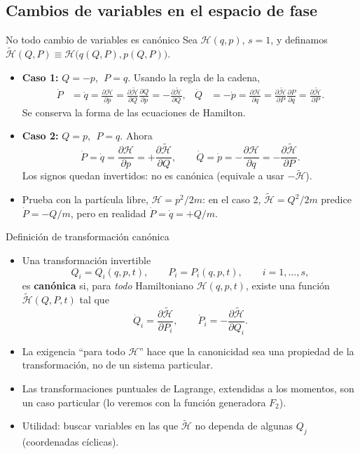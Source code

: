 \documentclass[spanish]{beamer}
\newcommand{\Ham}{\mathcal{H}}               %
\newcommand{\tH}{\tilde{\mathcal{H}}}        %
\newcommand{\pd}[2]{\frac{\partial #1}{\partial #2}}
\begin{document}
\subsection{Cambios de variables en el espacio de fase}
\begin{frame}{No todo cambio de variables es canónico}
\small
Sea $\Ham(q,p)$, $s=1$, y definamos $\tH(Q,P)\equiv\Ham\big(q(Q,P),p(Q,P)\big)$.
\begin{itemize}[<+->]
  \item \textbf{Caso 1:} $Q=-p$, $\;P=q$. Usando la regla de la cadena,
        \begin{align*}
          \dot P&=\dot q=\pd{\Ham}{p}=\pd{\tH}{Q}\pd{Q}{p}=-\pd{\tH}{Q}, &
          \dot Q&=-\dot p=\pd{\Ham}{q}=\pd{\tH}{P}\pd{P}{q}=\pd{\tH}{P}.
        \end{align*}
        \alert{Se conserva la forma de las ecuaciones de Hamilton.}
  \item \textbf{Caso 2:} $Q=p$, $\;P=q$. Ahora
        \[
          \dot P=\dot q=\pd{\Ham}{p}=+\pd{\tH}{Q},\qquad
          \dot Q=\dot p=-\pd{\Ham}{q}=-\pd{\tH}{P}.
        \]
        Los signos quedan invertidos: \alert{no es canónica}
        (equivale a usar $-\tH$).
  \item Prueba con la partícula libre, $\Ham=p^2/2m$: en el caso 2,
        $\tH=Q^2/2m$ predice $\dot P=-Q/m$, pero en realidad $\dot P=\dot q=+Q/m$.
\end{itemize}
\end{frame}

\begin{frame}{Definición de transformación canónica}
\begin{itemize}[<+->]
  \item Una transformación invertible
        \[
          Q_i=Q_i(q,p,t),\qquad P_i=P_i(q,p,t),\qquad i=1,\dots,s,
        \]
        es \textbf{canónica} si, para \emph{todo} Hamiltoniano $\Ham(q,p,t)$, existe
        una función $\tH(Q,P,t)$ tal que
        \[
          \dot Q_i=\pd{\tH}{P_i},\qquad \dot P_i=-\pd{\tH}{Q_i}.
        \]
  \item La exigencia “para todo $\Ham$” hace que la canonicidad sea una propiedad de la
        transformación, no de un sistema particular.
  \item Las transformaciones puntuales de Lagrange, extendidas a los momentos, son un
        caso particular (lo veremos con la función generadora $F_2$).
  \item Utilidad: buscar variables en las que $\tH$ no dependa de algunas $Q_j$
        (coordenadas cíclicas).
\end{itemize}
\end{frame}
\end{document}
